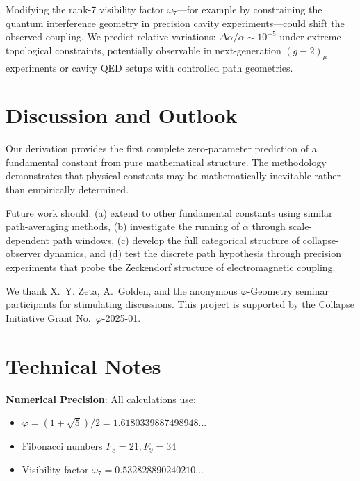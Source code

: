 \documentclass[%
 reprint,
 amsmath,amssymb,
 aps,
 prd,
 10pt,
 nofootinbib,      %
 longbibliography  %
]{revtex4-2}
\theoremstyle{definition}
\theoremstyle{remark}
\begin{document}
Modifying the rank-7 visibility factor $\omega_7$---for example by constraining
the quantum interference geometry in precision cavity experiments---could shift
the observed coupling. We predict relative variations:
\(\Delta\alpha/\alpha \sim 10^{-5}\)
under extreme topological constraints, potentially observable in next-generation
$(g-2)_\mu$ experiments or cavity QED setups with controlled path geometries.

\section{Discussion and Outlook}\label{sec:discussion}

Our derivation provides the first complete zero-parameter prediction
of a fundamental constant from pure mathematical structure.
The methodology demonstrates that physical constants may be
mathematically inevitable rather than empirically determined.

Future work should:
(a) extend to other fundamental constants using similar path-averaging methods,
(b) investigate the running of $\alpha$ through scale-dependent path windows,
(c) develop the full categorical structure of collapse-observer dynamics,
and (d) test the discrete path hypothesis through precision experiments
that probe the Zeckendorf structure of electromagnetic coupling.

\begin{acknowledgments}
We thank
X.~Y. Zeta,
A.~Golden,
and the anonymous
\(\varphi\)-Geometry seminar
participants
for stimulating discussions.
This project is supported by the
Collapse Initiative Grant No.~$\varphi$-2025-01.
\end{acknowledgments}


\appendix
\section{Technical Notes}
\label{app:technical}

\textbf{Numerical Precision}: All calculations use:
\begin{itemize}
\item $\varphi = (1+\sqrt{5})/2 = 1.6180339887498948...$
\item Fibonacci numbers $F_8 = 21, F_9 = 34$  
\item Visibility factor $\omega_7 = 0.532828890240210...$
\end{itemize}
\end{document}

